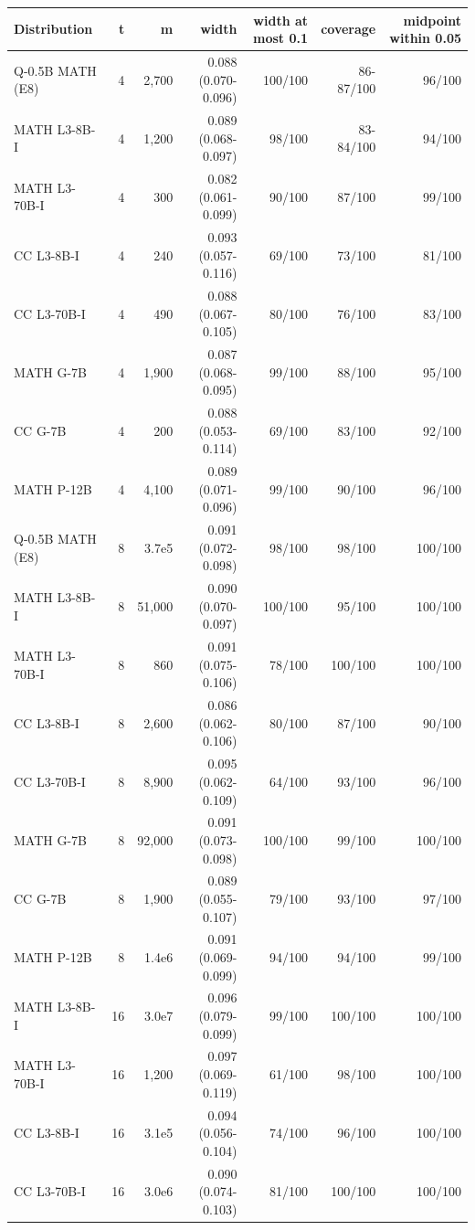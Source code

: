 \begin{table}[t]
\centering
\small
\begin{tabular}{lrrrrrr}
\toprule
Distribution & t & m & width & width at most 0.1 & coverage & midpoint within 0.05 \\
\midrule
Q-0.5B MATH (E8) & 4 & 2,700 & 0.088 (0.070-0.096) & 100/100 & 86-87/100 & 96/100 \\
MATH L3-8B-I & 4 & 1,200 & 0.089 (0.068-0.097) & 98/100 & 83-84/100 & 94/100 \\
MATH L3-70B-I & 4 & 300 & 0.082 (0.061-0.099) & 90/100 & 87/100 & 99/100 \\
CC L3-8B-I & 4 & 240 & 0.093 (0.057-0.116) & 69/100 & 73/100 & 81/100 \\
CC L3-70B-I & 4 & 490 & 0.088 (0.067-0.105) & 80/100 & 76/100 & 83/100 \\
MATH G-7B & 4 & 1,900 & 0.087 (0.068-0.095) & 99/100 & 88/100 & 95/100 \\
CC G-7B & 4 & 200 & 0.088 (0.053-0.114) & 69/100 & 83/100 & 92/100 \\
MATH P-12B & 4 & 4,100 & 0.089 (0.071-0.096) & 99/100 & 90/100 & 96/100 \\
Q-0.5B MATH (E8) & 8 & 3.7e5 & 0.091 (0.072-0.098) & 98/100 & 98/100 & 100/100 \\
MATH L3-8B-I & 8 & 51,000 & 0.090 (0.070-0.097) & 100/100 & 95/100 & 100/100 \\
MATH L3-70B-I & 8 & 860 & 0.091 (0.075-0.106) & 78/100 & 100/100 & 100/100 \\
CC L3-8B-I & 8 & 2,600 & 0.086 (0.062-0.106) & 80/100 & 87/100 & 90/100 \\
CC L3-70B-I & 8 & 8,900 & 0.095 (0.062-0.109) & 64/100 & 93/100 & 96/100 \\
MATH G-7B & 8 & 92,000 & 0.091 (0.073-0.098) & 100/100 & 99/100 & 100/100 \\
CC G-7B & 8 & 1,900 & 0.089 (0.055-0.107) & 79/100 & 93/100 & 97/100 \\
MATH P-12B & 8 & 1.4e6 & 0.091 (0.069-0.099) & 94/100 & 94/100 & 99/100 \\
MATH L3-8B-I & 16 & 3.0e7 & 0.096 (0.079-0.099) & 99/100 & 100/100 & 100/100 \\
MATH L3-70B-I & 16 & 1,200 & 0.097 (0.069-0.119) & 61/100 & 98/100 & 100/100 \\
CC L3-8B-I & 16 & 3.1e5 & 0.094 (0.056-0.104) & 74/100 & 96/100 & 100/100 \\
CC L3-70B-I & 16 & 3.0e6 & 0.090 (0.074-0.103) & 81/100 & 100/100 & 100/100 \\

\end{tabular}
\end{table}
